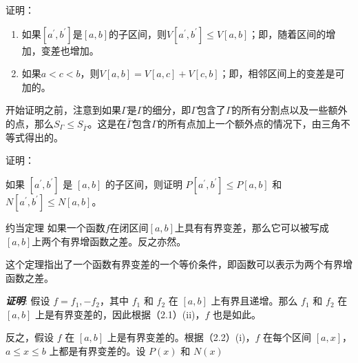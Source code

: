 \begin{example}{证明：}

\end{example}
\begin{theorem}{}
\begin{enumerate}
\item 如果$[a^{\prime},b^{\prime}]$是$[a,b]$的子区间，则$V[a^{\prime},b^{\prime}]\leq V[a,b]$；即，随着区间的增加，变差也增加。
\item 如果$a<c<b$，则$V[a,b]=V[a,c]+V[c,b]$；即，相邻区间上的变差是可加的。
\end{enumerate}
\end{theorem}
开始证明之前，注意到如果$\Gamma$是$\Gamma$的细分，即$\Gamma$包含了$\Gamma$的所有分割点以及一些额外的点，那么$S_{\Gamma}\leq S_{\bar{\Gamma}}$。这是在$\bar{\Gamma}$包含$\Gamma$的所有点加上一个额外点的情况下，由三角不等式得出的。

\begin{example}{证明：}

\end{example}

\begin{example}{如果 $[a^{\prime},b^{\prime}]$ 是 $[a,b]$ 的子区间，则证明 $P[a^{\prime},b^{\prime}]\leq P[a,b]$ 和 $N[a^{\prime},b^{\prime}]\leq N[a,b]$。}

\end{example}

\begin{corollary}{约当定理}
如果一个函数$f$在闭区间$[a,b]$上具有有界变差，那么它可以被写成$[a,b]$上两个有界增函数之差。反之亦然。
\end{corollary}

这个定理指出了一个函数有界变差的一个等价条件，即函数可以表示为两个有界增函数之差。

\textbf{\textsl{证明}}: 假设 $f=f_{1},-f_{2}$，其中 $f_{1}$ 和 $f_{2}$ 在 $[a,b]$ 上有界且递增。那么 $f_{1}$ 和 $f_{2}$ 在 $[a,b]$ 上是有界变差的，因此根据（2.1）(ii)，$f$ 也是如此。

反之，假设 $f$ 在 $[a,b]$ 上是有界变差的。根据（2.2）(i)，$f$ 在每个区间 $[a,x]$，$a\leq x\leq b$ 上都是有界变差的。设 $P(x)$ 和 $N(x)$
